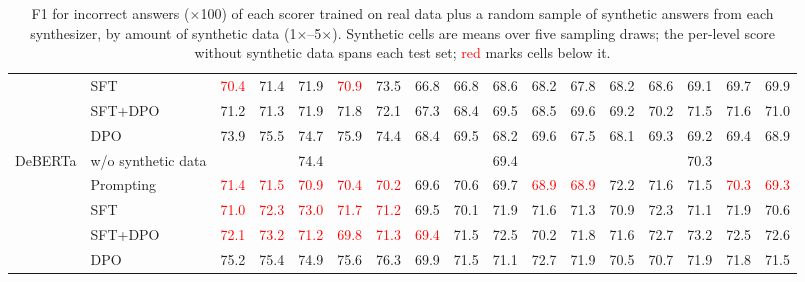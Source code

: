 \begin{table}[t]
\begin{tabular}{llccccccccccccccc}
 & SFT & \textcolor{red}{70.4} & 71.4 & 71.9 & \textcolor{red}{70.9} & 73.5 & 66.8 & 66.8 & 68.6 & 68.2 & 67.8 & 68.2 & 68.6 & 69.1 & 69.7 & 69.9 \\
 & SFT+DPO & 71.2 & 71.3 & 71.9 & 71.8 & 72.1 & 67.3 & 68.4 & 69.5 & 68.5 & 69.6 & 69.2 & 70.2 & 71.5 & 71.6 & 71.0 \\
 & DPO & 73.9 & 75.5 & 74.7 & 75.9 & 74.4 & 68.4 & 69.5 & 68.2 & 69.6 & 67.5 & 68.1 & 69.3 & 69.2 & 69.4 & 68.9 \\
\midrule
\multirow{5}{*}{DeBERTa} & w/o synthetic data & \multicolumn{5}{c}{74.4} & \multicolumn{5}{c}{69.4} & \multicolumn{5}{c}{70.3} \\
 & Prompting & \textcolor{red}{71.4} & \textcolor{red}{71.5} & \textcolor{red}{70.9} & \textcolor{red}{70.4} & \textcolor{red}{70.2} & 69.6 & 70.6 & 69.7 & \textcolor{red}{68.9} & \textcolor{red}{68.9} & 72.2 & 71.6 & 71.5 & \textcolor{red}{70.3} & \textcolor{red}{69.3} \\
 & SFT & \textcolor{red}{71.0} & \textcolor{red}{72.3} & \textcolor{red}{73.0} & \textcolor{red}{71.7} & \textcolor{red}{71.2} & 69.5 & 70.1 & 71.9 & 71.6 & 71.3 & 70.9 & 72.3 & 71.1 & 71.9 & 70.6 \\
 & SFT+DPO & \textcolor{red}{72.1} & \textcolor{red}{73.2} & \textcolor{red}{71.2} & \textcolor{red}{69.8} & \textcolor{red}{71.3} & \textcolor{red}{69.4} & 71.5 & 72.5 & 70.2 & 71.8 & 71.6 & 72.7 & 73.2 & 72.5 & 72.6 \\
 & DPO & 75.2 & 75.4 & 74.9 & 75.6 & 76.3 & 69.9 & 71.5 & 71.1 & 72.7 & 71.9 & 70.5 & 70.7 & 71.9 & 71.8 & 71.5 \\
\bottomrule
\end{tabular}
\caption{F1 for incorrect answers ($\times$100) of each scorer trained on real data plus a random sample of synthetic answers from each synthesizer, by amount of synthetic data (1$\times$--5$\times$). Synthetic cells are means over five sampling draws; the per-level score without synthetic data spans each test set; \textcolor{red}{red} marks cells below it.}
\label{tab:appendix-random-amount-level-0}
\end{table}

